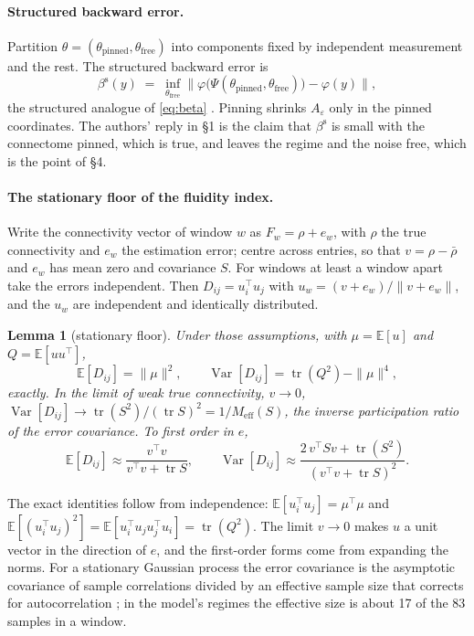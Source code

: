 \documentclass[11pt]{article}
\newtheorem{lemma}{Lemma}
\theoremstyle{definition}\newtheorem{observation}{Observation}
\theoremstyle{remark}\newtheorem{remark}{Remark}
\begin{document}
\paragraph{Structured backward error.} Partition $\theta=(\theta_{\mathrm{pinned}},\theta_{\mathrm{free}})$ into components fixed by independent measurement and the rest. The structured backward error is
\[
\beta^{\mathrm{s}}(y)\;=\;\inf_{\theta_{\mathrm{free}}}\bigl\|\varphi\bigl(\Psi(\theta_{\mathrm{pinned}},\theta_{\mathrm{free}})\bigr)-\varphi(y)\bigr\| ,
\]
the structured analogue of \eqref{eq:beta} \parencite{highamhigham1992}. Pinning shrinks $A_\varepsilon$ only in the pinned coordinates. The authors' reply in \S1 is the claim that $\beta^{\mathrm{s}}$ is small with the connectome pinned, which is true, and leaves the regime and the noise free, which is the point of \S4.

\paragraph{The stationary floor of the fluidity index.} Write the connectivity vector of window $w$ as $F_w=\rho+e_w$, with $\rho$ the true connectivity and $e_w$ the estimation error; centre across entries, so that $v=\rho-\bar\rho$ and $e_w$ has mean zero and covariance $S$. For windows at least a window apart take the errors independent. Then $D_{ij}=u_i^{\top}u_j$ with $u_w=(v+e_w)/\|v+e_w\|$, and the $u_w$ are independent and identically distributed.
\begin{lemma}[stationary floor]
Under those assumptions, with $\mu=\mathbb{E}[u]$ and $Q=\mathbb{E}[uu^{\top}]$,
\[
\mathbb{E}[D_{ij}]=\|\mu\|^{2},\qquad \operatorname{Var}[D_{ij}]=\operatorname{tr}(Q^{2})-\|\mu\|^{4},
\]
exactly. In the limit of weak true connectivity, $v\to 0$, $\operatorname{Var}[D_{ij}]\to\operatorname{tr}(S^{2})/(\operatorname{tr}S)^{2}=1/M_{\mathrm{eff}}(S)$, the inverse participation ratio of the error covariance. To first order in $e$,
\[
\mathbb{E}[D_{ij}]\approx\frac{v^{\top}v}{v^{\top}v+\operatorname{tr}S},\qquad
\operatorname{Var}[D_{ij}]\approx\frac{2\,v^{\top}Sv+\operatorname{tr}(S^{2})}{(v^{\top}v+\operatorname{tr}S)^{2}} .
\]
\end{lemma}
The exact identities follow from independence: $\mathbb{E}[u_i^{\top}u_j]=\mu^{\top}\mu$ and $\mathbb{E}[(u_i^{\top}u_j)^{2}]=\mathbb{E}[u_i^{\top}u_ju_j^{\top}u_i]=\operatorname{tr}(Q^{2})$. The limit $v\to0$ makes $u$ a unit vector in the direction of $e$, and the first-order forms come from expanding the norms. For a stationary Gaussian process the error covariance is the asymptotic covariance of sample correlations \parencite{steiger1980} divided by an effective sample size that corrects for autocorrelation \parencite{bartlett1935}; in the model's regimes the effective size is about 17 of the 83 samples in a window.
\end{document}
